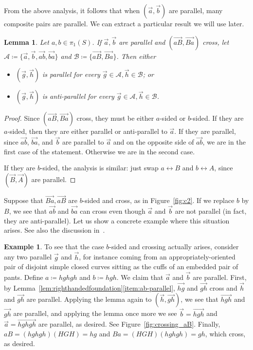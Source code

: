 \documentclass[11pt]{amsart}
\newcommand{\ora}[1]{\overrightarrow{#1}}
\numberwithin{equation}{section}
\numberwithin{figure}{section}
\newtheorem{lemma}[theorem]{Lemma}
\theoremstyle{definition}
\newtheorem{example}[theorem]{Example}
\theoremstyle{plain}
\begin{document}
From the above analysis, it follows that when $(\ora{a},\ora{b})$ are
parallel, many composite pairs are parallel. We can extract a
particular result we will use later.
\begin{lemma}\label{lem:a_parallel_Ba}
Let $a,b \in \pi_1(S)$.
If $\ora{a},\ora{b}$ are parallel and $(\ora{aB}, \ora{Ba})$ cross,
let $\mathcal{A} \coloneqq \{ \ora{a},\ora{b}, \ora{ab},\ora{ba} \}$
and $\mathcal{B} \coloneqq \{ \ora{aB}, \ora{Ba} \}$. Then either
\begin{itemize}
\item $(\ora{g},\ora{h})$ is parallel for every $\ora{g} \in \mathcal{A}, \ora{h} \in \mathcal{B}$; or
\item $(\ora{g},\ora{h})$ is anti-parallel for every $\ora{g} \in \mathcal{A}, \ora{h} \in \mathcal{B}$.
\end{itemize}
\end{lemma}
\begin{proof}
Since
$(\ora{aB},\ora{Ba})$ cross, they must be either $a$-sided or
$b$-sided.
If they are $a$-sided, then they are either parallel or anti-parallel to $\ora{a}$.
If they are parallel, since $\ora{ab}$, $\ora{ba}$, and $\ora{b}$ are parallel to
$\ora{a}$ and on the opposite side of $\ora{ab}$, we are in the first
case of the statement.
Otherwise we are in the second case.

If they are $b$-sided, the analysis is similar: just swap $a \leftrightarrow B$ and $b \leftrightarrow A$, since $(\ora{B},\ora{A})$ are parallel.
\end{proof}

Suppose that $\ora{Ba},\ora{aB}$ are $b$-sided and cross, as in Figure~\ref{fig:c2}. If we replace $b$ by $B$, we see that $\ora{ab}$ and
$\ora{ba}$ can cross even though $\ora{a}$ and $\ora{b}$ are not
parallel (in fact, they are anti-parallel). Let us show a concrete
example where this situation arises. See also the discussion
in~\cite{MGT25:SmoothingsErratum}.

\begin{example}
  To see that the case $b$-sided and crossing actually arises, consider any two parallel $\ora{g}$
  and $\ora{h}$, for instance coming from an appropriately-oriented
  pair of disjoint simple closed curves sitting
  as the cuffs of an embedded pair of pants.
  Define $a \coloneqq hghgh$ and $b
  \coloneqq hgh$. We claim that $\ora{a}$ and $\ora{b}$ are
  parallel. First, by
  Lemma~\ref{lem:righthandedfoundation}\ref{item:ab-parallel}, $\ora{hg}$ and $\ora{gh}$ cross and $\ora{h}$ and $\ora{gh}$ are
  parallel. Applying the lemma again to $(\ora{h},\ora{gh})$, we see
  that $\ora{hgh}$ and $\ora{gh}$ are parallel, and applying the lemma
  once more we see $\ora{b} = \ora{hgh}$ and $\ora{a} = \ora{hghgh}$
  are parallel, as desired. See Figure~\ref{fig:crossing_aB}.
  Finally, $aB=(hghgh)(HGH)=hg$ and $Ba=(HGH)(hghgh)=gh$, which cross,
  as desired.
  \label{ex:ab_parallel_aB_crossing}
\end{example}
\end{document}
